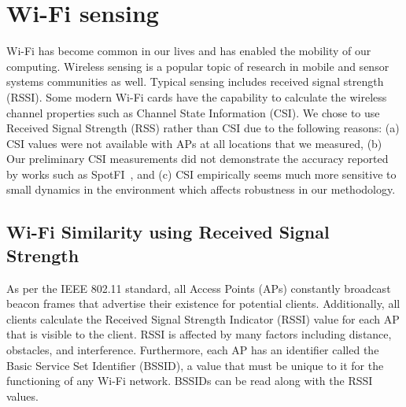 \vspace{-15pt}
\section{Wi-Fi sensing}
\label{sec:wifi}
Wi-Fi has become common in our lives and has enabled the mobility of our computing. Wireless sensing is a popular topic of research in mobile and sensor systems communities as well. Typical sensing includes received signal strength (RSSI). 
Some modern Wi-Fi cards have the capability to calculate the wireless channel properties such as  Channel State Information (CSI). We chose to use Received Signal Strength (RSS) rather than CSI due to the following reasons: (a) CSI values were not available with APs at all locations that we measured, (b) Our preliminary CSI measurements did not demonstrate the accuracy reported by works such as SpotFI~\cite{kotaru-sigcomm15}, and (c) CSI empirically seems much more sensitive to small dynamics in the environment which affects robustness in our methodology.  
\subsection{Wi-Fi Similarity using Received Signal Strength}
As per the IEEE 802.11 standard, all Access Points (APs) constantly broadcast beacon frames that advertise their existence for potential clients. 
Additionally, all clients calculate the Received Signal Strength Indicator (RSSI) value for each AP that is visible to the client. 
RSSI is affected by many factors including distance, obstacles, and interference. Furthermore, each AP has an identifier called the Basic Service Set Identifier (BSSID), a value that must be unique to it for the functioning of any Wi-Fi network. %
BSSIDs can be read along with the RSSI values. %


